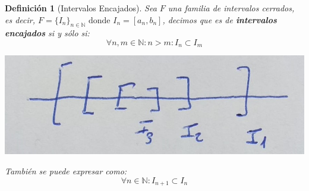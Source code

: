 \documentclass[10pt,a4paper,openright]{book}
\theoremstyle{break}
\newtheorem*{defi}{Definición}
\begin{document}
\begin{defi}[Intervalos Encajados]
Sea $F$ una familia de intervalos cerrados, es decir, $F=\{I_n\}_{n\in \mathbb N}\mbox{ donde }I_n=[a_n,b_n]$, decimos que es de \textbf{intervalos encajados} si y sólo si:
$$ \forall n, m\in \mathbb{N} : n >m : I_n\subset I_m$$
\begin{center}
\includegraphics[scale=0.20]{Intervalos encajados}
\end{center}
También se puede expresar como:
$$\forall n\in \mathbb N : I_{n+1}\subset I_{n}$$
\end{defi}
\end{document}
